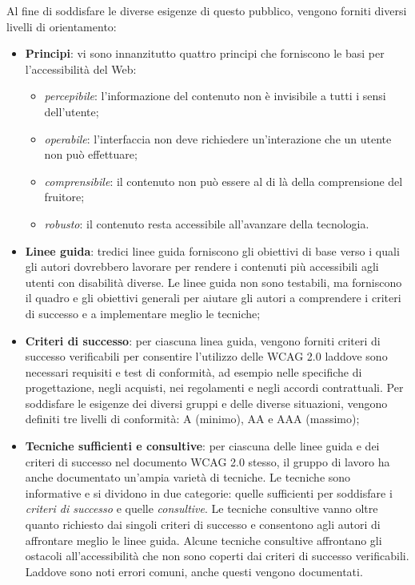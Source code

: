 Al fine di soddisfare le diverse esigenze di questo pubblico, vengono forniti diversi livelli di orientamento:
\begin{itemize}
\item \textbf{Principi}: vi sono innanzitutto quattro principi che forniscono le basi per l'accessibilità del Web:
\begin{itemize}
\item \textit{percepibile}: l'informazione del contenuto non è invisibile a tutti i sensi dell'utente;
\item \textit{operabile}: l'interfaccia non deve richiedere un'interazione che un utente non può effettuare;
\item \textit{comprensibile}: il contenuto non può essere al di là della comprensione del fruitore;
\item \textit{robusto}: il contenuto resta accessibile all'avanzare della tecnologia.
\end{itemize}
\item \textbf{Linee guida}: tredici linee guida forniscono gli obiettivi di base verso i quali gli autori dovrebbero lavorare per rendere i contenuti più accessibili agli utenti con disabilità diverse. Le linee guida non sono testabili, ma forniscono il quadro e gli obiettivi generali per aiutare gli autori a comprendere i criteri di successo e a implementare meglio le tecniche;
\item \textbf{Criteri di successo}: per ciascuna linea guida, vengono forniti criteri di successo verificabili per consentire l'utilizzo delle WCAG 2.0 laddove sono necessari requisiti e test di conformità, ad esempio nelle specifiche di progettazione, negli acquisti, nei regolamenti e negli accordi contrattuali. Per soddisfare le esigenze dei diversi gruppi e delle diverse situazioni, vengono definiti tre livelli di conformità: A (minimo), AA e AAA (massimo);
\item \textbf{Tecniche sufficienti e consultive}: per ciascuna delle linee guida e dei criteri di successo nel documento WCAG 2.0 stesso, il gruppo di lavoro ha anche documentato un'ampia varietà di tecniche. Le tecniche sono informative e si dividono in due categorie: quelle sufficienti per soddisfare i \textit{criteri di successo} e quelle \textit{consultive}. Le tecniche consultive vanno oltre quanto richiesto dai singoli criteri di successo e consentono agli autori di affrontare meglio le linee guida. Alcune tecniche consultive affrontano gli ostacoli all'accessibilità che non sono coperti dai criteri di successo verificabili. Laddove sono noti errori comuni, anche questi vengono documentati.
\end{itemize}

